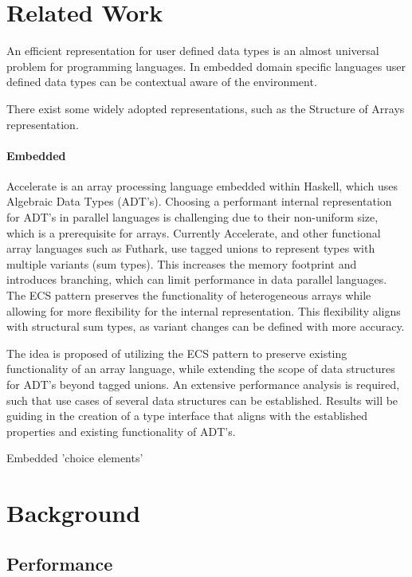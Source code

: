 \documentclass{article}
\begin{document}
\section{Related Work}

An efficient representation for user defined data types is an almost universal problem for programming languages.
In embedded domain specific languages user defined data types can be contextual aware of the environment. 


There exist some widely adopted representations, such as the Structure of Arrays representation.

\paragraph{Embedded}

Accelerate is an array processing language embedded within Haskell, which uses Algebraic Data Types (ADT's).
Choosing a performant internal representation for ADT's in parallel languages is challenging due to their non-uniform size, which is a prerequisite for arrays.
Currently Accelerate\cite{accelerate-sum-types}, and other functional array languages such as Futhark\cite{futhark-sum-types}, use tagged unions to represent types with multiple variants (sum types). 
This increases the memory footprint and introduces branching, which can limit performance in data parallel languages.   
The ECS pattern preserves the functionality of heterogeneous arrays while allowing for more flexibility for the internal representation.
This flexibility aligns with structural sum types, as variant changes can be defined with more accuracy. 

The idea is proposed of utilizing the ECS pattern to preserve existing functionality of an array language, while extending the scope of data structures for ADT's beyond tagged unions.
An extensive performance analysis is required, such that use cases of several data structures can be established.
Results will be guiding in the creation of a type interface that aligns with the established properties and existing functionality of ADT's. 


Embedded 'choice elements'

\newpage

\section{Background}

\subsection{Performance}
\end{document}
